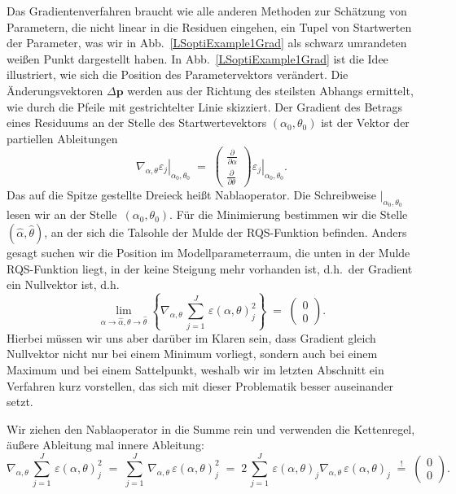 Das Gradientenverfahren braucht wie alle anderen Methoden zur Schätzung von Parametern, die
nicht linear in die Residuen eingehen, ein Tupel von Startwerten der Parameter, was wir in
Abb.~\ref{LSoptiExample1Grad} als schwarz umrandeten weißen Punkt dargestellt haben.
In Abb.~\ref{LSoptiExample1Grad} ist die Idee illustriert, wie sich die Position des
Parametervektors verändert. Die Änderungsvektoren $\Delta \mathbf{p}$ werden aus der Richtung
des steilsten Abhangs ermittelt, wie durch die Pfeile mit gestrichtelter Linie skizziert.
Der Gradient des Betrags eines Residuums an der Stelle des Startwertevektors $(\alpha_0, \theta_0)$
ist der Vektor der partiellen Ableitungen
\begin{equation}
\left. \nabla_{\alpha,\theta} \varepsilon_j \right|_{\alpha_0, \theta_0} \; = \;
\left(\begin{array}{c}
\frac{\partial}{\partial \alpha} \\
\frac{\partial}{\partial \theta}
\end{array}\right) \left. \varepsilon_j \right|_{\alpha_0, \theta_0} .
\end{equation}
Das auf die Spitze gestellte Dreieck heißt Nablaoperator.
Die Schreibweise $|_{\alpha_0, \theta_0}$ lesen wir \glqq an der Stelle\grqq ~$(\alpha_0, \theta_0)$.
Für die Minimierung bestimmen wir die Stelle $(\hat \alpha, \hat \theta)$, an der sich die Talsohle
der Mulde der RQS-Funktion befinden. Anders gesagt suchen wir die Position im Modellparameterraum,
die unten in der Mulde RQS-Funktion liegt,
in der keine Steigung mehr vorhanden ist, d.h.\ der Gradient ein Nullvektor ist, d.h.
\begin{equation}
\lim_{\alpha \rightarrow \hat \alpha, \theta \rightarrow \hat \theta}
\left\{\nabla_{\alpha,\theta} \,
\sum\limits_{j=1}^J \, \varepsilon(\alpha,\theta)_j^2
\right\} \; = \;
\left(\begin{array}{c}
0 \\
0
\end{array}\right) .
\label{LSschaetzung1}
\end{equation}
Hierbei müssen wir uns aber darüber im Klaren sein, dass Gradient gleich Nullvektor nicht nur
bei einem Minimum vorliegt, sondern auch bei einem Maximum und bei einem Sattelpunkt, weshalb wir
im letzten Abschnitt ein Verfahren kurz vorstellen, das sich mit dieser Problematik besser
auseinander setzt.

Wir ziehen den Nablaoperator in die Summe rein und
verwenden die Kettenregel, äußere Ableitung mal innere Ableitung:
\begin{equation}
\nabla_{\alpha,\theta} \,
\sum\limits_{j=1}^J \, \varepsilon(\alpha,\theta)_j^2
 \; = \;
\sum\limits_{j=1}^J \, \nabla_{\alpha,\theta} \, \varepsilon(\alpha,\theta)_j^2
 \; = \;
2 \, \sum\limits_{j=1}^J \, \varepsilon(\alpha,\theta)_j \nabla_{\alpha,\theta} \, \varepsilon(\alpha,\theta)_j
 \; \overset{!}{=} \;
\left(\begin{array}{c}
0 \\
0
\end{array}\right) .
\label{GradientQ2params}
\end{equation}

